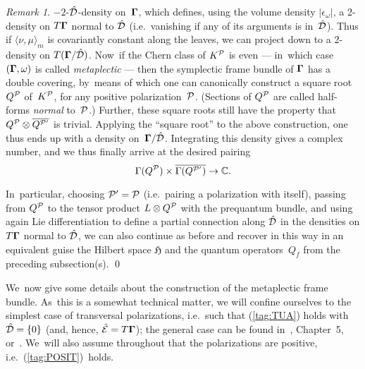 \documentclass[12pt]{amsart}
\numberwithin{equation}{section}
\theoremstyle{remark}
\newtheorem{remark*}{Remark}
\newcommand\spr[2]{\langle #1,#2\rangle}
\newcommand\Omg{{\bigam}}   %
\newcommand\PP{{\Cal P}}
\newcommand\DD{{\Cal D}}
\newcommand\EE{{\Cal E}}
\newcommand\GG{{\PP'}}
\newcommand\hatDD{{\hat\DD}}
\newcommand\hatEE{\hat\EE}
\newcommand\HH{\mathfrak H}
\newcommand{\CC}{\C}
\newcommand{\bigam}{\mbox{\boldmath $\Gamma$}}
\newcommand{\C}{\mathbb C}
\begin{document}
\begin{remark*}
$-2$-$\hatDD$-density on~$\Omg$, which defines, using the volume density
$|\epsilon_\omega|$, a 2-density on $T\Omg$ normal to $\hatDD$ (i.e.~vanishing
if any of its arguments is in~$\hatDD$). Thus if $\spr\nu\mu_m$ is covariantly
constant along the leaves, we can project down to a 2-density on
$T(\Omg/\hatDD)$. Now~if the Chern class of $K^\PP$ is even --- in~which case
$(\Omg,\omega)$ is called {\it metaplectic\/} --- then the symplectic frame
bundle of $\Omg$ has a double covering, by~means of which one can canonically
construct a square root $Q^\PP$ of~$K^\PP$, for any positive
polarization~$\PP$. (Sections of $Q^\PP$ are called half-forms {\it normal\/}
to~$\PP$.) Further, these square roots still have the property that
$Q^\PP\otimes\overline{Q^\GG}$ is trivial. Applying the ``square root'' to the
above construction, one thus ends up with a density on~$\Omg/\hatDD$.
Integrating this density gives a complex number, and we thus finally arrive at
the desired pairing
$$ \Gamma(Q^\PP) \times \overline{\Gamma(Q^\GG)} \to\CC.   $$

In~particular, choosing $\GG=\PP$ (i.e.~pairing a polarization with itself),
passing from $Q^\PP$ to the tensor product $L\otimes Q^\PP$ with the prequantum
bundle, and using again Lie differentiation to define a partial connection
along $\hatDD$ in the densities on $T\Omg$ normal to $\hatDD$, we can also
continue as before and recover in this way in an equivalent guise the Hilbert
space $\HH$ and the quantum operators~$Q_f$ from the preceding subsection(s).
\qed   \end{remark*}

\medskip

We~now give some details about the construction of the metaplectic frame
bundle. As~this is a somewhat technical matter, we will confine ourselves to
the simplest case of transversal polarizations, i.e.~such that (\ref{tag:TUA})
holds with $\hatDD=\{0\}$ (and, hence, $\hatEE=T\Omg$); the general case can be
found in~\cite{bib:SniaB}, Chapter~5, or~\cite{bib:BlattLN}. We~will also
assume throughout that the polarizations are positive,
i.e.~(\ref{tag:POSIT})~holds.
\end{document}
